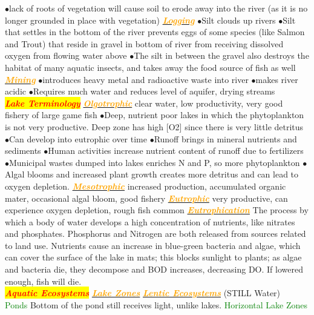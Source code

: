 \documentclass{article}
\newcommand{\ddd}{$\bullet$}
\newcommand{\red}[1]{\textcolor{red}{#1}}
\newcommand{\green}[1]{\textcolor{green}{#1}}
\newcommand{\orange}[1]{\textcolor{orange}{#1}}
\newcommand{\mysection}[1]{\colorbox{yellow}{\textbf{\textit{\red{#1}}}}}
\newcommand{\mysubsection}[1]{\underline{\textbf{{\textit{\orange{#1}}}}}}
\newcommand{\mysubsub}[1]{{{\green{#1}}}}
\begin{document}
\begin{multicols*}{4}
            \ddd lack of roots of vegetation will cause soil to erode away into the river (as it is no longer grounded in place with vegetation) 
        \mysubsection{Logging}
            \ddd Silt clouds up rivers
            \ddd Silt that settles in the bottom of the river prevents eggs of some species (like Salmon and Trout) that reside in gravel in bottom of river from receiving dissolved oxygen from flowing water above
            \ddd The silt in between the gravel also destroys the habitat of many aquatic insects, and takes away the food source of fish as well
        \mysubsection{Mining}
            \ddd introduces heavy metal and radioactive waste into river
            \ddd makes river acidic
            \ddd Requires much water and reduces level of aquifer, drying streams
    \\
    \mysection{Lake Terminology}
        \mysubsection{Olgotrophic} clear water, low productivity, very good fishery of large game fish
            \ddd Deep, nutrient poor lakes in which the phytoplankton is not very productive. Deep zone has high [O2] since there is very little detritus
            \ddd Can develop into eutrophic over time
            \ddd Runoff brings in mineral nutrients and sediments
            \ddd Human activities increase nutrient content of runoff due to fertilizers
            \ddd Municipal wastes dumped into lakes enriches N and P, so more phytoplankton
            \ddd Algal blooms and increased plant growth creates more detritus and can lead to oxygen depletion.
        \mysubsection{Mesotrophic} increased production, accumulated organic mater, occasional algal bloom, good fishery
        \mysubsection{Eutrophic} very productive, can experience oxygen depletion, rough fish common
        \mysubsection{Eutrophication} 
        	The process by which a body of water develops a high concentration of nutrients, like nitrates and phosphates. Phosphorus and Nitrogen are both released from sources related to land use. Nutrients cause an increase in blue-green bacteria and algae, which can cover the surface of the lake in mats; this blocks sunlight to plants; as algae and bacteria die, they decompose and BOD increases, decreasing DO. If lowered enough, fish will die. 
    \\
    \mysection{Aquatic Ecosystems}
        \mysubsection{Lake Zones}
            \mysubsection{Lentic Ecosystems} (STILL Water) \\
            \mysubsub{Ponds} Bottom of the pond still receives light, unlike lakes.
            \mysubsub{Horizontal Lake Zones}

\end{multicols*}
\end{document}
